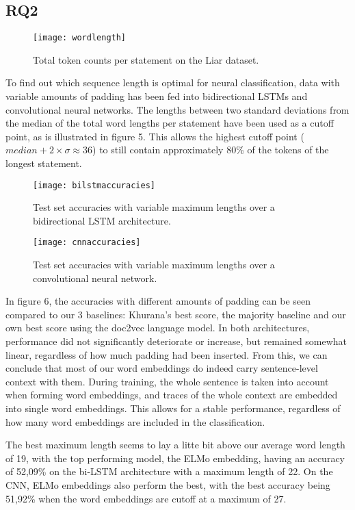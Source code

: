 \subsection{RQ2}

\begin{figure}[b!]
    \centering
    \texttt{[image: wordlength]}
    \caption{Total token counts per statement on the Liar dataset.}
\end{figure}

To find out which sequence length is optimal for neural classification, data with variable amounts of padding has been fed into bidirectional LSTMs and convolutional neural networks.
The lengths between two standard deviations from the median of the total word lengths per statement have been used as a cutoff point, as is illustrated in figure 5. 
This allows the highest cutoff point (\(median + 2 \times \sigma \approx 36\)) to still contain approximately 80\% of the tokens of the longest statement.

\begin{figure}[b]
    \texttt{[image: bilstmaccuracies]}
    \caption{Test set accuracies with variable maximum lengths over a bidirectional LSTM architecture.}
\end{figure}
    
\begin{figure}[b]
    \texttt{[image: cnnaccuracies]}
    \caption{Test set accuracies with variable maximum lengths over a convolutional neural network.}
\end{figure}

In figure 6, the accuracies with different amounts of padding can be seen compared to our 3 baselines: Khurana's best score, the majority baseline and our own best score using the doc2vec language model.
In both architectures, performance did not significantly deteriorate or increase, but remained somewhat linear, regardless of how much padding had been inserted.
From this, we can conclude that most of our word embeddings do indeed carry sentence-level context with them.
During training, the whole sentence is taken into account when forming word embeddings, and traces of the whole context are embedded into single word embeddings.
This allows for a stable performance, regardless of how many word embeddings are included in the classification.

The best maximum length seems to lay a litte bit above our average word length of 19, with the top performing model, the ELMo embedding, having an accuracy of 52,09\% on the bi-LSTM architecture with a maximum length of 22.
On the CNN, ELMo embeddings also perform the best, with the best accuracy being 51,92\% when the word embeddings are cutoff at a maximum of 27. 

